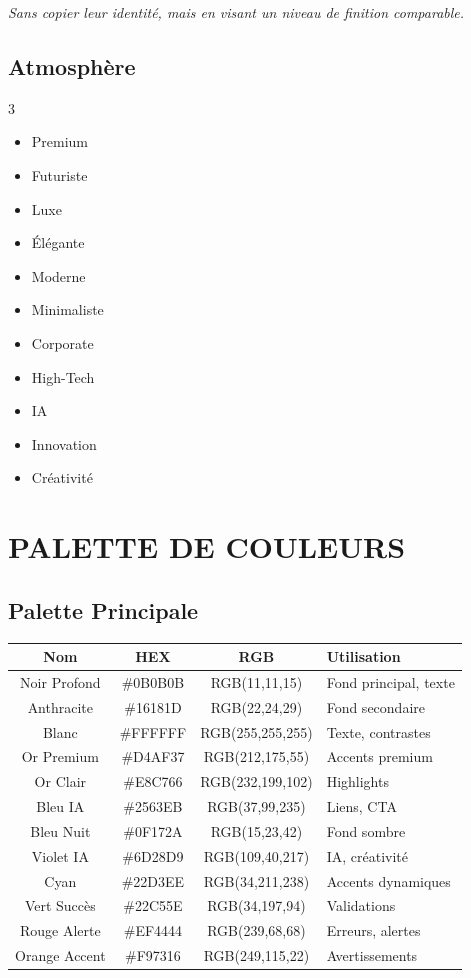\documentclass[12pt,a4paper,oneside]{book}
\begin{document}
\skip
\skip
\textit{Sans copier leur identité, mais en visant un niveau de finition comparable.}

\section{Atmosphère}
\begin{multicols}{3}
\begin{itemize}
\item Premium
\item Futuriste
\item Luxe
\item Élégante
\item Moderne
\item Minimaliste
\item Corporate
\item High-Tech
\item IA
\item Innovation
\item Créativité
\end{itemize}
\end{multicols}

\chapter{PALETTE DE COULEURS}

\section{Palette Principale}
\begin{center}
\begin{tabular}{|c|c|c|p{6cm}|}
\hline
\rowcolor{noir}
\color{white}\textbf{Nom} & \color{white}\textbf{HEX} & \color{white}\textbf{RGB} & \color{white}\textbf{Utilisation} \\
\hline
Noir Profond & \#0B0B0B & RGB(11,11,15) & Fond principal, texte \\
\hline
Anthracite & \#16181D & RGB(22,24,29) & Fond secondaire \\
\hline
Blanc & \#FFFFFF & RGB(255,255,255) & Texte, contrastes \\
\hline
Or Premium & \#D4AF37 & RGB(212,175,55) & Accents premium \\
\hline
Or Clair & \#E8C766 & RGB(232,199,102) & Highlights \\
\hline
Bleu IA & \#2563EB & RGB(37,99,235) & Liens, CTA \\
\hline
Bleu Nuit & \#0F172A & RGB(15,23,42) & Fond sombre \\
\hline
Violet IA & \#6D28D9 & RGB(109,40,217) & IA, créativité \\
\hline
Cyan & \#22D3EE & RGB(34,211,238) & Accents dynamiques \\
\hline
Vert Succès & \#22C55E & RGB(34,197,94) & Validations \\
\hline
Rouge Alerte & \#EF4444 & RGB(239,68,68) & Erreurs, alertes \\
\hline
Orange Accent & \#F97316 & RGB(249,115,22) & Avertissements \\
\hline
\end{tabular}
\end{center}
\end{document}
